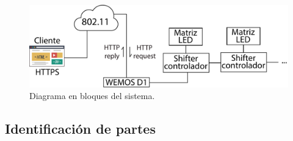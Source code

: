 \begin{figure}[ht]
	\centering
	\begin{center}
		\includegraphics[width=\textwidth]{imagenes/diagrama-bloques.pdf}
		\caption{Diagrama en bloques del sistema.}
		\label{fig:Prop-Cap-response}
	\end{center}
\end{figure}


\subsection{Identificación de partes}

